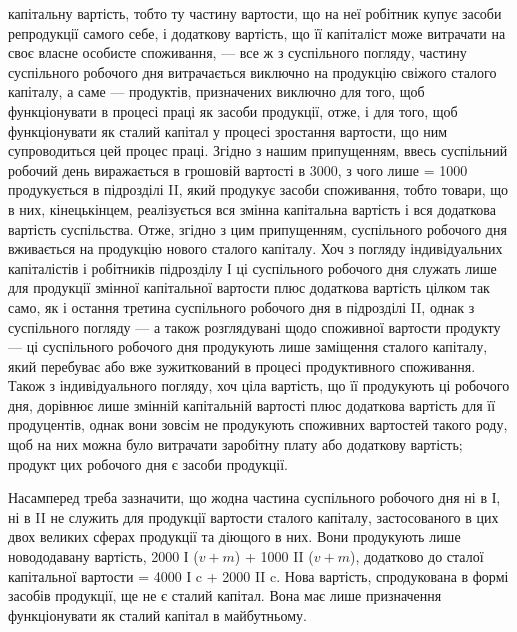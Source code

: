 \parcont{}  %
капітальну вартість, тобто ту частину вартости, що на неї робітник купує
засоби репродукції самого себе, і додаткову вартість, що її капіталіст
може витрачати на своє власне особисте споживання, — все ж з суспільного
погляду, частину суспільного робочого дня витрачається виключно на
продукцію свіжого сталого капіталу, а саме — продуктів, призначених
виключно для того, щоб функціонувати в процесі праці як засоби
продукції, отже, і для того, щоб функціонувати як сталий капітал у
процесі зростання вартости, що ним супроводиться цей процес праці.
Згідно з нашим припущенням, ввесь суспільний робочий день виражається в
грошовій вартості в 3000, з чого лише  = 1000 продукується в підрозділі
II, який продукує засоби споживання, тобто товари, що в них, кінецькінцем,
реалізується вся змінна капітальна вартість і вся додаткова вартість
суспільства. Отже, згідно з цим припущенням,  суспільного робочого
дня вживається на продукцію нового сталого капіталу. Хоч з погляду
індивідуальних капіталістів і робітників підрозділу І ці  суспільного
робочого дня служать лише для продукції змінної капітальної вартости
плюс додаткова вартість цілком так само, як і остання третина суспільного
робочого дня в підрозділі II, однак з суспільного погляду — а
також розглядувані щодо споживної вартости продукту — ці  суспільного
робочого дня продукують лише заміщення сталого капіталу, який
перебуває або вже зужиткований в процесі продуктивного споживання.
Також з індивідуального погляду, хоч ціла вартість, що її продукують ці
 робочого дня, дорівнює лише змінній капітальній вартості плюс додаткова
вартість для її продуцентів, однак вони зовсім не продукують
споживних вартостей такого роду, щоб на них можна було витрачати
заробітну плату або додаткову вартість; продукт цих  робочого дня є
засоби продукції.

Насамперед треба зазначити, що жодна частина суспільного робочого
дня ні в І, ні в II не служить для продукції вартости сталого капіталу,
застосованого в цих двох великих сферах продукції та діющого в них.
Вони продукують лише новододавану вартість, 2000 І ($v + m$) + 1000
II ($v + m$), додатково до сталої капітальної вартости = 4000 І c + 2000
II c. Нова вартість, спродукована в формі засобів продукції, ще не є
сталий капітал. Вона має лише призначення функціонувати як сталий
капітал в майбутньому.

